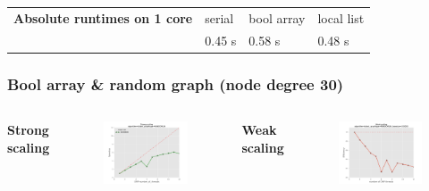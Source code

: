 \begin{frame}
\begin{table}
\tiny
\begin{tabular}{lp{1cm}|p{1cm}|p{1cm}}
 {\bfseries Absolute runtimes on 1 core}  & serial  & bool array  & local list\\
                                          & 0.45 s  & 0.58 s      & 0.48 s
\end{tabular}
\end{table}

\end{frame}


\begin{frame}
\frametitle{Bool array \& random graph (node degree 30)}
\begin{columns}[T]
  \bfseries{Strong scaling}
  \begin{figure}[!ht]
    \begin{center}
      \includegraphics[width=\textwidth]{img/strongscaling_bitset_gtRANDOMLIN30_opt1.pdf}
    \end{center}
  \end{figure}
  \bfseries{Weak scaling}
  \begin{figure}[!ht]
    \begin{center}
      \includegraphics[width=\textwidth]{img/weakscaling_bitset_gtRANDOMLIN30_opt1.pdf}

\end{center}
\end{figure}
\end{columns}
\end{frame}
